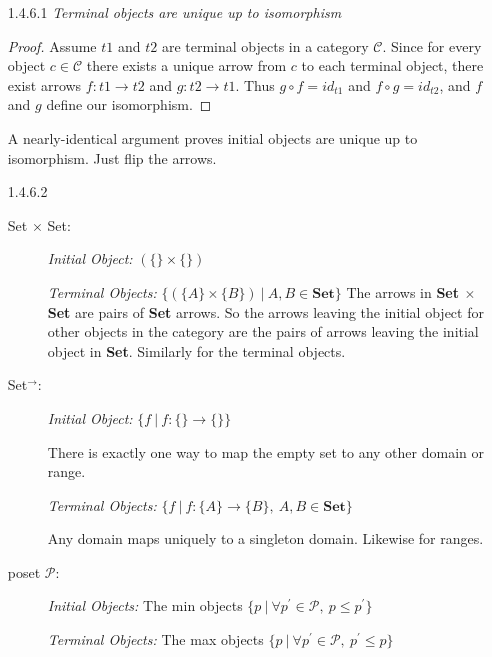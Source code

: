 \documentclass{article}
\begin{document}
\begin{enumerate}
\item[1.4.6.1]
  \textit{Terminal objects are unique up to isomorphism}
  \begin{proof}
    Assume $t1$ and $t2$ are terminal objects in a category $\mathcal{C}$.
    Since for every object $c\in\mathcal{C}$ there exists a unique arrow from $c$ to each terminal object, there exist arrows $f:t1\rightarrow t2$ and $g:t2 \rightarrow t1$.
    Thus $g \circ f = id_{t1}$ and $f \circ g = id_{t2}$, and $f$ and $g$ define our isomorphism.
  \end{proof}

  A nearly-identical argument proves initial objects are unique up to isomorphism.
  Just flip the arrows.

\item[1.4.6.2]
  \begin{description}
  \item[Set $\times$ Set:]
  \item[]
    \textit{Initial Object:} $(\{\} \times \{\})$

    \textit{Terminal Objects:} $\{ (\{A\} \times \{B\} )\ |\ A,B \in \textbf{Set} \}$
    The arrows in \textbf{Set $\times$ Set} are pairs of \textbf{Set} arrows.
    So the arrows leaving the initial object for other objects in the category are the pairs of arrows leaving the initial object in \textbf{Set}.
    Similarly for the terminal objects.

  \item[]
  \item[Set$^\rightarrow$:]
  \item[]
    \textit{Initial Object:} $\{ f~|~f : \{\} \rightarrow \{\} \}$

    There is exactly one way to map the empty set to any other domain or range.
  \item[]
    \textit{Terminal Objects:} $\{ f~|~f : \{A\} \rightarrow \{B\},~ A,B \in \textbf{Set}\}$

    Any domain maps uniquely to a singleton domain.
    Likewise for ranges.

  \item[poset $\mathcal{P}$:]
  \item[]
    \textit{Initial Objects:} The min objects
    $\{ p \ |\ \forall p^\prime\in \mathcal{P},\ p \le p^\prime \}$
  \item[]
    \textit{Terminal Objects:} The max objects 
    $\{ p \ |\ \forall p^\prime\in \mathcal{P},\ p^\prime \le p \}$
  \end{description}


\end{enumerate}
\end{document}
